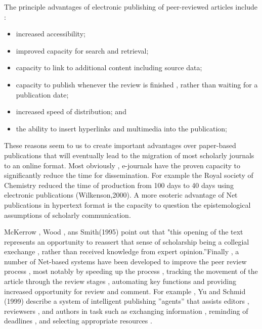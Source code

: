 \documentclass{beamer}
\begin{document}
  \begin{frame}
  
The principle advantages of electronic publishing of peer-reviewed articles include :

\begin{itemize}
\item increased accessibility;
\item improved capacity for search and retrieval;
\item capacity to link to additional content including source data;
\item capacity to publish whenever the review is finished , rather than waiting for a publication date;
\item increased speed of distribution; and
\item the ability to insert hyperlinks and multimedia into the publication;
\end{itemize}

  \end{frame}
  
\begin{frame}

These reasons seem to us to create important advantages over paper-based publications that will eventually lead to the migration of most scholarly journals to an online format. Most obviously , e-journals have the proven capacity to significantly reduce the time for dissemination. For example the Royal society of Chemistry reduced the time of production from 100 days to 40 days using electronic publications (Wilkenson,2000). A more esoteric advantage of Net publications in hypertext format is the capacity to question the epistemological assumptions of scholarly communication.

  \end{frame}
  
\begin{frame}
McKerrow , Wood , ans Smith(1995) point out that "this opening of the text represents an opportunity to reassert that sense of scholarship being a collegial exechange , rather than received knowledge from expert opinion.''Finally , a number of Net-based systems have been developed to improve the peer review process , most notably by speeding up the process , tracking the movement of the article through the review stages , automating key functions and providing increased opportunity for review and comment. For example , Yu and Schmid (1999)  describe a system of intelligent publishing ''agents'' that assists editors , reviewsers , and authors in task such as exchanging information , reminding of deadlines , and selecting appropriate resources .

 \end{frame}
 
\end{document}
